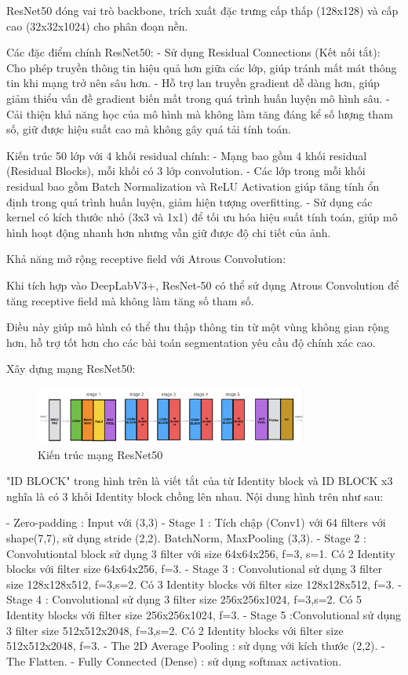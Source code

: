 \documentclass[12pt]{report}
\begin{document}
ResNet50 đóng vai trò backbone, trích xuất đặc trưng cấp thấp (128x128) và cấp cao (32x32x1024) cho phân đoạn nền.

Các đặc điểm chính ResNet50:
- Sử dụng Residual Connections (Kết nối tắt): Cho phép truyền thông tin hiệu quả hơn giữa các lớp, giúp tránh mất mát thông tin khi mạng trở nên sâu hơn.
- Hỗ trợ lan truyền gradient dễ dàng hơn, giúp giảm thiểu vấn đề gradient biến mất trong quá trình huấn luyện mô hình sâu.
- Cải thiện khả năng học của mô hình mà không làm tăng đáng kể số lượng tham số, giữ được hiệu suất cao mà không gây quá tải tính toán.

Kiến trúc 50 lớp với 4 khối residual chính:
- Mạng bao gồm 4 khối residual (Residual Blocks), mỗi khối có 3 lớp convolution.
- Các lớp trong mỗi khối residual bao gồm Batch Normalization và ReLU Activation giúp tăng tính ổn định trong quá trình huấn luyện, giảm hiện tượng overfitting.
- Sử dụng các kernel có kích thước nhỏ (3x3 và 1x1) để tối ưu hóa hiệu suất tính toán, giúp mô hình hoạt động nhanh hơn nhưng vẫn giữ được độ chi tiết của ảnh.

Khả năng mở rộng receptive field với Atrous Convolution:

Khi tích hợp vào DeepLabV3+, ResNet-50 có thể sử dụng Atrous Convolution để tăng receptive field mà không làm tăng số tham số.

Điều này giúp mô hình có thể thu thập thông tin từ một vùng không gian rộng hơn, hỗ trợ tốt hơn cho các bài toán segmentation yêu cầu độ chính xác cao.

Xây dựng mạng ResNet50:

\begin{figure}[h]
    \centering
    \includegraphics[width=0.8\textwidth]{resnet50.png}
    \caption{Kiến trúc mạng ResNet50}
\end{figure}

"ID BLOCK" trong hình trên là viết tắt của từ Identity block và ID BLOCK x3 nghĩa là có 3 khối Identity block chồng lên nhau. Nội dung hình trên như sau:

- Zero-padding : Input với (3,3)
- Stage 1 : Tích chập (Conv1) với 64 filters với shape(7,7), sử dụng stride (2,2). BatchNorm, MaxPooling (3,3).
- Stage 2 : Convolutiontal block sử dụng 3 filter với size 64x64x256, f=3, s=1. Có 2 Identity blocks với filter size 64x64x256, f=3.
- Stage 3 : Convolutional sử dụng 3 filter size 128x128x512, f=3,s=2. Có 3 Identity blocks với filter size 128x128x512, f=3.
- Stage 4 : Convolutional sử dụng 3 filter size 256x256x1024, f=3,s=2. Có 5 Identity blocks với filter size 256x256x1024, f=3.
- Stage 5 :Convolutional sử dụng 3 filter size 512x512x2048, f=3,s=2. Có 2 Identity blocks với filter size 512x512x2048, f=3.
- The 2D Average Pooling : sử dụng với kích thước (2,2).
- The Flatten.
- Fully Connected (Dense) : sử dụng softmax activation.
\end{document}
